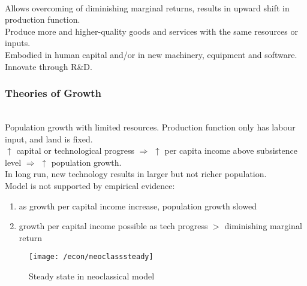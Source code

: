 \begin{remark} \\
Allows overcoming of diminishing marginal returns, results in upward shift in production function.\\
Produce more and higher-quality goods and services with the same resources or inputs.\\
Embodied in human capital and/or in new machinery, equipment and software. Innovate through R\&D.
\end{remark}

\subsubsection{Theories of Growth}

\begin{definition} \\
Population growth with limited resources. Production function only has labour input, and land is fixed.\\
$\uparrow$ capital or technological progress $\Rightarrow$ $\uparrow$ per capita income above subsistence level $\Rightarrow$ $\uparrow$ population growth.\\
In long run, new technology results in larger but not richer population.\\
Model is not supported by empirical evidence:
\begin{enumerate}[label=\roman*.]
\setlength{\itemsep}{0pt}
\item as growth per capital income increase, population growth slowed
\item growth per capital income possible as tech progress $>$ diminishing marginal return
\end{enumerate}
\end{definition}

\begin{figure}[H]
\centering
\texttt{[image: /econ/neoclasssteady]}
\caption{Steady state in neoclassical model}
\end{figure}

